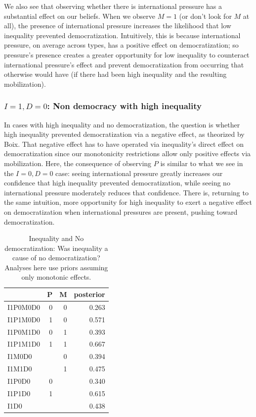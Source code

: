 \documentclass[
  12pt,
]{book}
\begin{document}
We also see that observing whether there is international pressure has a substantial effect on our beliefs. When we observe \(M=1\) (or don't look for \(M\) at all), the presence of international pressure increases the likelihood that low inequality prevented democratization. Intuitively, this is because international pressure, on average across types, has a positive effect on democratization; so pressure's presence creates a greater opportunity for low inequality to counteract international pressure's effect and prevent democratization from occurring that otherwise would have (if there had been high inequality and the resulting mobilization).

\hypertarget{i1-d0-non-democracy-with-high-inequality}{%
\subsubsection{\texorpdfstring{\(I=1, D=0\): Non democracy with high inequality}{I=1, D=0: Non democracy with high inequality}}\label{i1-d0-non-democracy-with-high-inequality}}

In cases with high inequality and no democratization, the question is whether high inequality prevented democratization via a negative effect, as theorized by Boix. That negative effect has to have operated via inequality's direct effect on democratization since our monotonicity restrictions allow only positive effects via mobilization. Here, the consequence of observing \(P\) is similar to what we see in the \(I=0, D=0\) case: seeing international pressure greatly increases our confidence that high inequality prevented democratization, while seeing no international pressure moderately reduces that confidence. There is, returning to the same intuition, more opportunity for high inequality to exert a negative effect on democratization when international pressures are present, pushing toward democratization.

\begin{table}

\caption{\label{tab:Tapp2}Inequality and No democratization: Was inequality a cause of no democratization? Analyses here use priors assuming only monotonic effects.}
\centering
\begin{tabular}[t]{l|r|r|r}
\hline
  & P & M & posterior\\
\hline
I1P0M0D0 & 0 & 0 & 0.263\\
\hline
I1P1M0D0 & 1 & 0 & 0.571\\
\hline
I1P0M1D0 & 0 & 1 & 0.393\\
\hline
I1P1M1D0 & 1 & 1 & 0.667\\
\hline
I1M0D0 &  & 0 & 0.394\\
\hline
I1M1D0 &  & 1 & 0.475\\
\hline
I1P0D0 & 0 &  & 0.340\\
\hline
I1P1D0 & 1 &  & 0.615\\
\hline
I1D0 &  &  & 0.438\\
\hline
\end{tabular}
\end{table}
\end{document}

